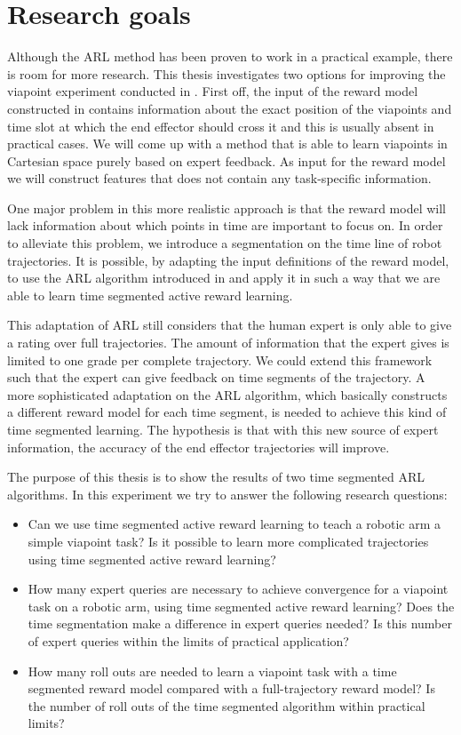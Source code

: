 \documentclass[mscThesis.tex]{subfiles}
\begin{document}
\section{Research goals}
\label{sec:research-goals}
Although the ARL method has been proven to work in a practical example, there is room for more research. This thesis investigates two options for improving the viapoint experiment conducted in \cite{Daniel2015}. First off, the input of the reward model constructed in \cite{Daniel2015} contains information about the exact position of the viapoints and time slot at which the end effector should cross it and this is usually absent in practical cases. We will come up with a method that is able to learn viapoints in Cartesian space purely based on expert feedback. As input for the reward model we will construct features that does not contain any task-specific information. 

One major problem in this more realistic approach is that the reward model will lack information about which points in time are important to focus on. In order to alleviate this problem, we introduce a segmentation on the time line of robot trajectories. It is possible, by adapting the input definitions of the reward model, to use the ARL algorithm introduced in \cite{Daniel2015} and apply it in such a way that we are able to learn time segmented active reward learning. 

This adaptation of ARL still considers that the human expert is only able to give a rating over full trajectories. The amount of information that the expert gives is limited to one grade per complete trajectory. We could extend this framework such that the expert can give feedback on time segments of the trajectory. A more sophisticated adaptation on the ARL algorithm, which basically constructs a different reward model for each time segment, is needed to achieve this kind of time segmented learning. The hypothesis is that with this new source of expert information, the accuracy of the end effector trajectories will improve.

The purpose of this thesis is to show the results of two time segmented ARL algorithms. In this experiment we try to answer the following research questions: 

\begin{itemize}
\item Can we use time segmented active reward learning to teach a robotic arm a simple viapoint task? Is it possible to learn more complicated trajectories using time segmented active reward learning?
\item How many expert queries are necessary to achieve convergence for a viapoint task on a robotic arm, using time segmented active reward learning? Does the time segmentation make a difference in expert queries needed? Is this number of expert queries within the limits of practical application? 
\item How many roll outs are needed to learn a viapoint task with a time segmented reward model compared with a full-trajectory reward model? Is the number of roll outs of the time segmented algorithm within practical limits? 
\end{itemize}
\end{document}
